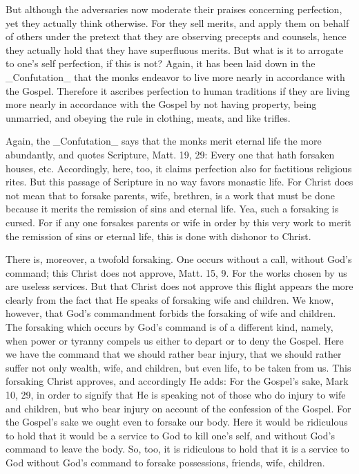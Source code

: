 But although the adversaries now moderate their praises concerning
perfection, yet they actually think otherwise.  For they sell merits,
and apply them on behalf of others under the pretext that they are
observing precepts and counsels, hence they actually hold that they
have superfluous merits.  But what is it to arrogate to one's self
perfection, if this is not?  Again, it has been laid down in the
_Confutation_ that the monks endeavor to live more nearly in
accordance with the Gospel.  Therefore it ascribes perfection to
human traditions if they are living more nearly in accordance with
the Gospel by not having property, being unmarried, and obeying the
rule in clothing, meats, and like trifles.

Again, the _Confutation_ says that the monks merit eternal life the
more abundantly, and quotes Scripture, Matt. 19, 29: Every one that
hath forsaken houses, etc. Accordingly, here, too, it claims
perfection also for factitious religious rites.  But this passage of
Scripture in no way favors monastic life.  For Christ does not mean
that to forsake parents, wife, brethren, is a work that must be done
because it merits the remission of sins and eternal life.  Yea, such
a forsaking is cursed.  For if any one forsakes parents or wife in
order by this very work to merit the remission of sins or eternal
life, this is done with dishonor to Christ.

There is, moreover, a twofold forsaking.  One occurs without a call,
without God's command; this Christ does not approve, Matt. 15, 9. For
the works chosen by us are useless services.  But that Christ does
not approve this flight appears the more clearly from the fact that
He speaks of forsaking wife and children.  We know, however, that
God's commandment forbids the forsaking of wife and children.  The
forsaking which occurs by God's command is of a different kind,
namely, when power or tyranny compels us either to depart or to deny
the Gospel.  Here we have the command that we should rather bear
injury, that we should rather suffer not only wealth, wife, and
children, but even life, to be taken from us.  This forsaking Christ
approves, and accordingly He adds: For the Gospel's sake, Mark 10, 29,
in order to signify that He is speaking not of those who do injury
to wife and children, but who bear injury on account of the
confession of the Gospel.  For the Gospel's sake we ought even to
forsake our body.  Here it would be ridiculous to hold that it would
be a service to God to kill one's self, and without God's command to
leave the body.  So, too, it is ridiculous to hold that it is a service
to God without God's command to forsake possessions, friends, wife,
children.


